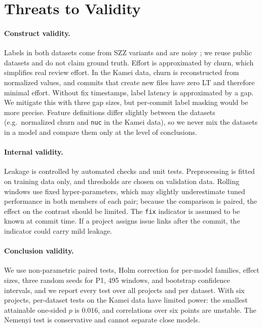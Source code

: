 \section{Threats to Validity}\label{sec:threats}

\paragraph{Construct validity.} Labels in both datasets come from SZZ variants and are noisy \citep{herbold2022}; we reuse public datasets and do not claim ground truth. Effort is approximated by churn, which simplifies real review effort. In the Kamei data, churn is reconstructed from normalized values, and commits that create new files have zero LT and therefore minimal effort. Without fix timestamps, label latency is approximated by a gap. We mitigate this with three gap sizes, but per-commit label masking would be more precise. Feature definitions differ slightly between the datasets (e.g.\ normalized churn and \texttt{nuc} in the Kamei data), so we never mix the datasets in a model and compare them only at the level of conclusions.

\paragraph{Internal validity.} Leakage is controlled by automated checks and unit tests. Preprocessing is fitted on training data only, and thresholds are chosen on validation data. Rolling windows use fixed hyper-parameters, which may slightly underestimate tuned performance in both members of each pair; because the comparison is paired, the effect on the contrast should be limited. The \texttt{fix} indicator is assumed to be known at commit time. If a project assigns issue links after the commit, the indicator could carry mild leakage.

\paragraph{Conclusion validity.} We use non-parametric paired tests, Holm correction for per-model families, effect sizes, three random seeds for P1, 495 windows, and bootstrap confidence intervals, and we report every test over all projects and per dataset. With six projects, per-dataset tests on the Kamei data have limited power: the smallest attainable one-sided $p$ is 0.016, and correlations over six points are unstable. The Nemenyi test is conservative and cannot separate close models.

